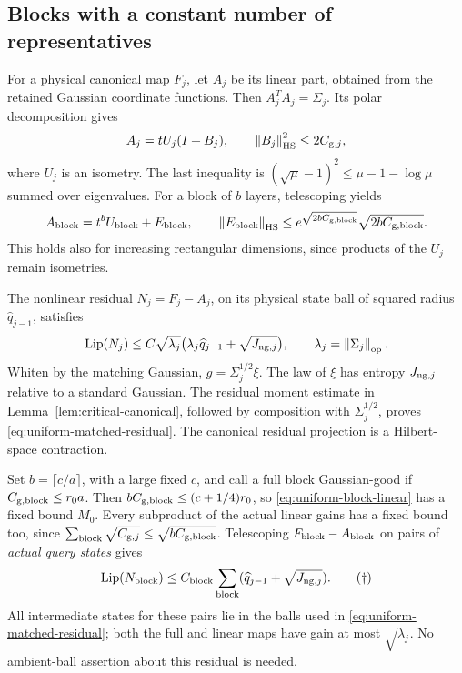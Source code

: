 \documentclass[11pt]{article}
\theoremstyle{remark}
\newcommand{\Lip}{\operatorname{Lip}}
\newcommand{\norm}[1]{\left\lVert #1\right\rVert}
\begin{document}
\subsection{Blocks with a constant number of representatives}

For a physical canonical map $F_j$, let $A_j$ be its linear
part, obtained from the retained Gaussian coordinate functions.
Then $A_j^TA_j=\Sigma_j$. Its polar decomposition gives
\[
 A_j=tU_j(I+B_j),\qquad
 \norm{B_j}_{\rm HS}^2\le2C_{{\rm g},j},
\]
where $U_j$ is an isometry. The last inequality is
$(\sqrt\mu-1)^2\le\mu-1-\log\mu$ summed over eigenvalues.
For a block of $b$ layers, telescoping yields
\begin{equation}
 A_{\rm block}=t^bU_{\rm block}+E_{\rm block},\qquad
 \norm{E_{\rm block}}_{\rm HS}
 \le e^{\sqrt{2bC_{\rm g,block}}}
                   \sqrt{2bC_{\rm g,block}}.
 \label{eq:uniform-block-linear}
\end{equation}
This holds also for increasing rectangular dimensions, since
products of the $U_j$ remain isometries.

The nonlinear residual $N_j=F_j-A_j$, on its physical state
ball of squared radius $\widehat q_{j-1}$, satisfies
\begin{equation}
 \Lip(N_j)\le C\sqrt{\lambda_j}
       \bigl(\lambda_j\widehat q_{j-1}+
                         \sqrt{J_{{\rm ng},j}}\bigr),
 \qquad\lambda_j=\norm{\Sigma_j}_{\rm op}.
 \label{eq:uniform-matched-residual}
\end{equation}
Whiten by the matching Gaussian, $g=\Sigma_j^{1/2}\xi$.
The law of $\xi$ has entropy $J_{{\rm ng},j}$ relative to
a standard Gaussian. The residual moment estimate in
Lemma~\ref{lem:critical-canonical}, followed by composition
with $\Sigma_j^{1/2}$, proves
\eqref{eq:uniform-matched-residual}. The canonical residual
projection is a Hilbert-space contraction.

Set $b=\lceil c/a\rceil$, with a large fixed $c$, and call a
full block Gaussian-good if
$C_{\rm g,block}\le r_0a$. Then
$bC_{\rm g,block}\le(c+1/4)r_0$, so
\eqref{eq:uniform-block-linear} has a fixed bound $M_0$.
Every subproduct of the actual linear gains has a fixed
bound too, since
$\sum_{\rm block}\sqrt{C_{{\rm g},j}}
\le\sqrt{bC_{\rm g,block}}$.
Telescoping $F_{\rm block}-A_{\rm block}$ on pairs of
\emph{actual query states} gives
\[
 \Lip(N_{\rm block})\le C_{\rm block}
       \sum_{\rm block}
       (\widehat q_{j-1}+\sqrt{J_{{\rm ng},j}}).
 \tag{\(\dagger\)}
\]
All intermediate states for these pairs lie in the balls
used in \eqref{eq:uniform-matched-residual}; both the full
and linear maps have gain at most $\sqrt{\lambda_j}$.
No ambient-ball assertion about this residual is needed.
\end{document}
